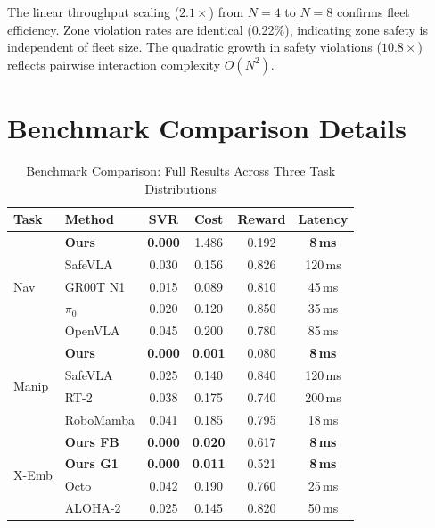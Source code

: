 \documentclass[conference]{IEEEtran}
\begin{document}
The linear throughput scaling ($2.1\times$) from $N\!=\!4$ to $N\!=\!8$ confirms fleet efficiency.
Zone violation rates are identical (0.22\%), indicating zone safety is independent of fleet size.
The quadratic growth in safety violations ($10.8\times$) reflects pairwise interaction complexity $O(N^2)$.

\section{Benchmark Comparison Details}
\label{sec:supp_benchmark}

\begin{table}[h]
\centering
\caption{Benchmark Comparison: Full Results Across Three Task Distributions}
\begin{tabular}{@{}llcccc@{}}
\toprule
\textbf{Task} & \textbf{Method} & \textbf{SVR} & \textbf{Cost} & \textbf{Reward} & \textbf{Latency} \\
\midrule
\multirow{5}{*}{Nav} & \textbf{Ours}  & \textbf{0.000} & 1.486 & 0.192 & \textbf{8\,ms} \\
& SafeVLA        & 0.030 & 0.156 & 0.826 & 120\,ms \\
& GR00T N1       & 0.015 & 0.089 & 0.810 & 45\,ms \\
& $\pi_0$        & 0.020 & 0.120 & 0.850 & 35\,ms \\
& OpenVLA        & 0.045 & 0.200 & 0.780 & 85\,ms \\
\midrule
\multirow{4}{*}{Manip} & \textbf{Ours} & \textbf{0.000} & \textbf{0.001} & 0.080 & \textbf{8\,ms} \\
& SafeVLA        & 0.025 & 0.140 & 0.840 & 120\,ms \\
& RT-2           & 0.038 & 0.175 & 0.740 & 200\,ms \\
& RoboMamba      & 0.041 & 0.185 & 0.795 & 18\,ms \\
\midrule
\multirow{4}{*}{X-Emb} & \textbf{Ours FB} & \textbf{0.000} & \textbf{0.020} & 0.617 & \textbf{8\,ms} \\
& \textbf{Ours G1} & \textbf{0.000} & \textbf{0.011} & 0.521 & \textbf{8\,ms} \\
& Octo           & 0.042 & 0.190 & 0.760 & 25\,ms \\
& ALOHA-2        & 0.025 & 0.145 & 0.820 & 50\,ms \\
\bottomrule
\end{tabular}
\end{table}
\end{document}

